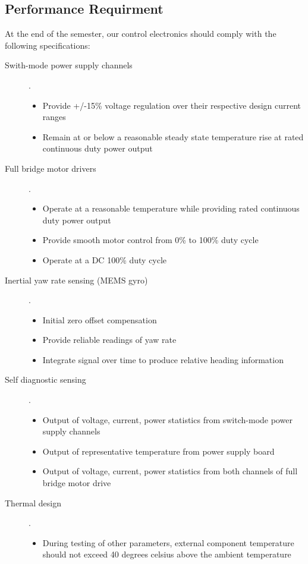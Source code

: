 \documentclass[12pt]{article}
\begin{document}
 \subsection{Performance Requirment}
 At the end of the semester, our control electronics should comply with the following specifications:
 \begin{description}
    \item[Swith-mode power supply channels]. 
    \begin{itemize}
       \item Provide +/-15\% voltage regulation over their respective design current ranges
       \item Remain at or below a reasonable steady state temperature rise at rated continuous duty power output
       \end{itemize}
    \item[Full bridge motor drivers]. 
    \begin{itemize}
       \item Operate at a reasonable temperature while providing rated continuous duty power output
      \item  Provide smooth motor control from 0\% to 100\% duty cycle
      \item Operate at a DC 100\% duty cycle
      \end{itemize}
    \item[Inertial yaw rate sensing (MEMS gyro)]. 
    \begin{itemize}
      \item Initial zero offset compensation 
      \item Provide reliable readings of yaw rate
      \item Integrate signal over time to produce relative heading information
      \end{itemize}
    \item[Self diagnostic sensing]. 
    \begin{itemize}
      \item Output of voltage, current, power statistics from switch-mode power supply channels
      \item Output of representative temperature from power supply board
      \item Output of voltage, current, power statistics from both channels of full bridge motor drive
      \end{itemize}
    \item[Thermal design]. 
    \begin{itemize}
      \item During testing of other parameters, external component temperature should not exceed 40 degrees celsius above the ambient temperature
      \end{itemize}
 \end{description}
 
\end{document}
